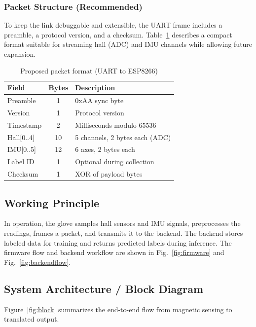 \documentclass[conference]{IEEEtran}
\begin{document}
\subsubsection{Packet Structure (Recommended)}
To keep the link debuggable and extensible, the UART frame includes a preamble, a protocol version, and a checksum. Table~\ref{tab:packet} describes a compact format suitable for streaming hall (ADC) and IMU channels while allowing future expansion.

\begin{table}[htbp]
    \centering
    \caption{Proposed packet format (UART to ESP8266)}
    \begin{tabularx}{\columnwidth}{@{}lcX@{}}
        \toprule
        Field & Bytes & Description \\
        \midrule
        Preamble & 1 & 0xAA sync byte \\
        Version & 1 & Protocol version \\
        Timestamp & 2 & Milliseconds modulo 65536 \\
        Hall[0..4] & 10 & 5 channels, 2 bytes each (ADC) \\
        IMU[0..5] & 12 & 6 axes, 2 bytes each \\
        Label ID & 1 & Optional during collection \\
        Checksum & 1 & XOR of payload bytes \\
        \bottomrule
    \end{tabularx}
    \label{tab:packet}
\end{table}

\subsection{Working Principle}
In operation, the glove samples hall sensors and IMU signals, preprocesses the readings, frames a packet, and transmits it to the backend. The backend stores labeled data for training and returns predicted labels during inference. The firmware flow and backend workflow are shown in Fig.~\ref{fig:firmware} and Fig.~\ref{fig:backendflow}.

\subsection{System Architecture / Block Diagram}
Figure~\ref{fig:block} summarizes the end-to-end flow from magnetic sensing to translated output.
\end{document}
